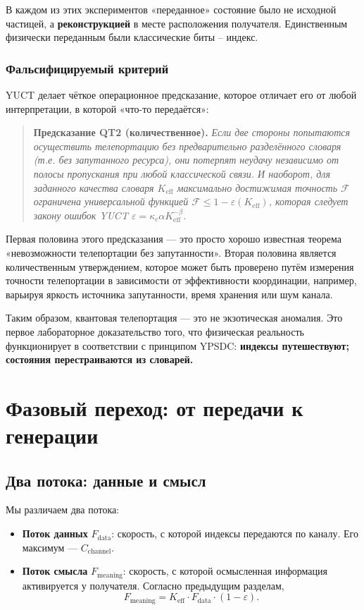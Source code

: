 \documentclass[12pt,a4paper]{article}
\theoremstyle{remark}
\newcommand{\Keff}{K_{\mathrm{eff}}}
\begin{document}
	В каждом из этих экспериментов «переданное» состояние было не исходной частицей, а \textbf{реконструкцией} в месте расположения получателя. Единственным физически переданным были классические биты – индекс.
	
	\subsubsection{Фальсифицируемый критерий}
	
	YUCT делает чёткое операционное предсказание, которое отличает его от любой интерпретации, в которой «что-то передаётся»:
	
	\begin{quote}
		\textbf{Предсказание QT2 (количественное).} \emph{Если две стороны попытаются осуществить телепортацию без предварительно разделённого словаря (т.е. без запутанного ресурса), они потерпят неудачу независимо от полосы пропускания при любой классической связи. И наоборот, для заданного качества словаря $K_{\mathrm{eff}}$ максимально достижимая точность $\mathcal{F}$ ограничена универсальной функцией $\mathcal{F} \le 1 - \varepsilon(K_{\mathrm{eff}})$, которая следует закону ошибок YUCT $\varepsilon = \kappa_c \alpha K_{\mathrm{eff}}^{-\beta}$.}
	\end{quote}
	
	Первая половина этого предсказания — это просто хорошо известная теорема «невозможности телепортации без запутанности». Вторая половина является количественным утверждением, которое может быть проверено путём измерения точности телепортации в зависимости от эффективности координации, например, варьируя яркость источника запутанности, время хранения или шум канала.
	
	Таким образом, квантовая телепортация — это не экзотическая аномалия. Это первое лабораторное доказательство того, что физическая реальность функционирует в соответствии с принципом YPSDC: \textbf{индексы путешествуют; состояния перестраиваются из словарей.}
	
	\section{Фазовый переход: от передачи к генерации}
	\label{sec:transition}
	
	\subsection{Два потока: данные и смысл}
	
	Мы различаем два потока:
	\begin{itemize}
		\item \textbf{Поток данных} $F_{\text{data}}$: скорость, с которой индексы передаются по каналу. Его максимум — $C_{\text{channel}}$.
		\item \textbf{Поток смысла} $F_{\text{meaning}}$: скорость, с которой осмысленная информация активируется у получателя. Согласно предыдущим разделам,
		\[
		F_{\text{meaning}} = \Keff \cdot F_{\text{data}} \cdot (1 - \varepsilon).
		\]
	\end{itemize}
	
\end{document}
